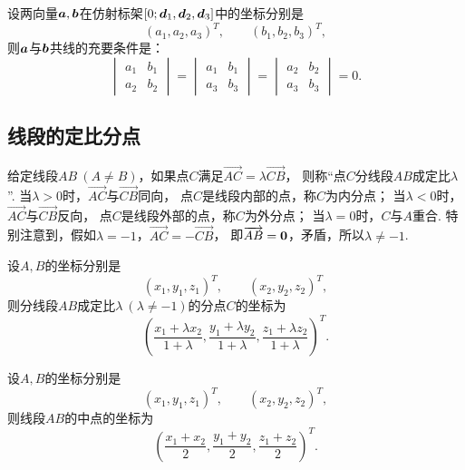 \begin{theorem}\label{theorem:解析几何.两向量共线的充要条件2}
设两向量\(\boldsymbol{a},\boldsymbol{b}\)在仿射标架\([0;\boldsymbol{d}_1,\boldsymbol{d}_2,\boldsymbol{d}_3]\)中的坐标分别是\[
	(a_1,a_2,a_3)^T, \qquad
	(b_1,b_2,b_3)^T,
\]
则\(\boldsymbol{a}\)与\(\boldsymbol{b}\)共线的充要条件是：\[
\begin{vmatrix}
	a_1 & b_1 \\
	a_2 & b_2
\end{vmatrix}
= \begin{vmatrix}
	a_1 & b_1 \\
	a_3 & b_3
\end{vmatrix}
= \begin{vmatrix}
	a_2 & b_2 \\
	a_3 & b_3
\end{vmatrix} = 0.
\]
\end{theorem}

\subsection{线段的定比分点}
给定线段\(AB\ (A \neq B)\)，如果点\(C\)满足\(\vec{AC} = \lambda \vec{CB}\)，
则称“点\(C\)分线段\(AB\)成定比\(\lambda\)”.
当\(\lambda>0\)时，\(\vec{AC}\)与\(\vec{CB}\)同向，
点\(C\)是线段内部的点，称\(C\)为内分点；
当\(\lambda<0\)时，\(\vec{AC}\)与\(\vec{CB}\)反向，
点\(C\)是线段外部的点，称\(C\)为外分点；
当\(\lambda=0\)时，\(C\)与\(A\)重合.
特别注意到，假如\(\lambda=-1\)，\(\vec{AC}=-\vec{CB}\)，
即\(\overrightarrow{AB}=\boldsymbol{0}\)，矛盾，所以\(\lambda\neq-1\).

\begin{theorem}\label{theorem:解析几何.空间两点的定比分点公式}
设\(A,B\)的坐标分别是\[
	(x_1,y_1,z_1)^T, \qquad
	(x_2,y_2,z_2)^T,
\]
则分线段\(AB\)成定比\(\lambda\ (\lambda\neq-1)\)的分点\(C\)的坐标为
\begin{equation}
	\left(
		\frac{x_1 + \lambda x_2}{1+\lambda},
		\frac{y_1 + \lambda y_2}{1+\lambda},
		\frac{z_1 + \lambda z_2}{1+\lambda}
	\right)^T.
\end{equation}
\end{theorem}

\begin{corollary}
设\(A,B\)的坐标分别是\[
	(x_1,y_1,z_1)^T, \qquad
	(x_2,y_2,z_2)^T,
\]
则线段\(AB\)的中点的坐标为
\begin{equation}
	\left(
		\frac{x_1 + x_2}{2},
		\frac{y_1 + y_2}{2},
		\frac{z_1 + z_2}{2}
	\right)^T.
\end{equation}
\end{corollary}

